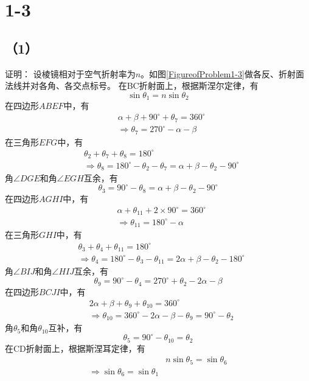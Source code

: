 \documentclass[10pt,a4paper]{article}
\theoremstyle{remark}
\begin{document}
\section*{1-3}
\subsection*{（1）}证明：
设棱镜相对于空气折射率为$n$。如图\ref{FigureofProblem1-3}做各反、折射面法线并对各角、各交点标号。
在BC折射面上，根据斯涅尔定律，有
\[
\sin\theta_1 = n\sin\theta_2
\]
在四边形$ABEF$中，有
\begin{align*}
&\alpha + \beta + 90^{\circ} + \theta_7 = 360^{\circ}\\
&\Longrightarrow\theta_7 = 270^{\circ} - \alpha - \beta
\end{align*}
在三角形$EFG$中，有
\begin{align*}
&\theta_2 + \theta_7 + \theta_8 = 180^{\circ}\\
&\Longrightarrow\theta_8 = 180^{\circ} - \theta_2 - \theta_7 = \alpha + \beta - \theta_2 - 90^{\circ}
\end{align*}
角$\angle DGE$和角$\angle EGH$互余，有
\[
\theta_3 = 90^{\circ} - \theta_8 = \alpha + \beta - \theta_2 - 90^{\circ}
\]
在四边形$AGHI$中，有
\begin{align*}
&\alpha + \theta_11 + 2\times90^{\circ} = 360^{\circ}\\
&\Longrightarrow\theta_11 = 180^{\circ} - \alpha
\end{align*}
在三角形$GHI$中，有
\begin{align*}
&\theta_3 + \theta_4 + \theta_11 = 180^{\circ}\\
&\Longrightarrow\theta_4 = 180^{\circ} - \theta_3 - \theta_11 = 2\alpha + \beta - \theta_2 - 180^{\circ}
\end{align*}
角$\angle BIJ$和角$\angle HIJ$互余，有
\[
\theta_9 = 90^{\circ} - \theta_4 = 270^{\circ} + \theta_2 - 2\alpha - \beta
\]
在四边形$BCJI$中，有
\begin{align*}
&2\alpha + \beta + \theta_9 + \theta_10 = 360^{\circ}\\
&\Longrightarrow\theta_10 = 360^{\circ} - 2\alpha - \beta - \theta_9 = 90^{\circ} - \theta_2
\end{align*}
角$\theta_5$和角$\theta_10$互补，有
\[
\theta_5 = 90^{\circ} - \theta_10 = \theta_2
\]
在CD折射面上，根据斯涅耳定律，有
\begin{align*}
&n\sin\theta_5 = \sin\theta_6\\
\Longrightarrow\sin\theta_6 = \sin\theta_1
\end{align*}
\end{document}
